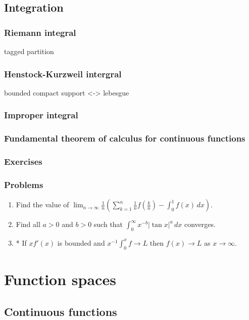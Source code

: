 \documentclass{../../large}
\begin{document}
\chapter{Integration}

\section{Riemann integral}
tagged partition
\section{Henstock-Kurzweil intergral}
bounded compact support <-> lebesgue
\section{Improper integral}
\section{Fundamental theorem of calculus for continuous functions}

\section*{Exercises}

\section*{Problems}
\begin{enumerate}
\item Find the value of $\lim_{n\to\infty}\frac1n\left(\sum_{k=1}^n\frac1nf\left(\frac kn\right)-\int_0^1f(x)\,dx\right)$.
\item Find all $a>0$ and $b>0$ such that $\int_0^\infty x^{-b}|\tan x|^a\,dx$ converges.
\item* If $xf'(x)$ is bounded and $x^{-1}\int_0^xf\to L$ then $f(x)\to L$ as $x\to\infty$.
\end{enumerate}









\part{Function spaces}

\chapter{Continuous functions}
\end{document}
